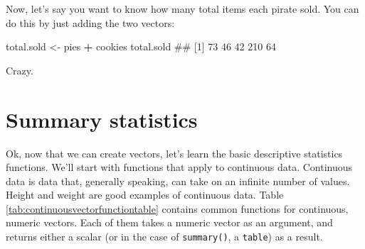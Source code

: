\documentclass[]{book}
\newenvironment{Shaded}{\begin{snugshade}}{\end{snugshade}}
\newcommand{\StringTok}[1]{\textcolor[rgb]{0.31,0.60,0.02}{#1}}
\newcommand{\OperatorTok}[1]{\textcolor[rgb]{0.81,0.36,0.00}{\textbf{#1}}}
\newcommand{\NormalTok}[1]{#1}
\theoremstyle{definition}
\theoremstyle{definition}
\theoremstyle{remark}
\begin{document}
Now, let's say you want to know how many total items each pirate sold.
You can do this by just adding the two vectors:

\begin{Shaded}
\begin{Highlighting}[]
\NormalTok{total.sold <-}\StringTok{ }\NormalTok{pies }\OperatorTok{+}\StringTok{ }\NormalTok{cookies}
\NormalTok{total.sold}
\NormalTok{## [1]  73  46  42 210  64}
\end{Highlighting}
\end{Shaded}

Crazy.

\section{Summary statistics}\label{summary-statistics}

Ok, now that we can create vectors, let's learn the basic descriptive
statistics functions. We'll start with functions that apply to
continuous data. Continuous data is data that, generally speaking, can
take on an infinite number of values. Height and weight are good
examples of continuous data. Table
\ref{tab:continuousvectorfunctiontable} contains common functions for
continuous, numeric vectors. Each of them takes a numeric vector as an
argument, and returns either a scalar (or in the case of
\texttt{summary()}, a \texttt{table}) as a result.
\end{document}
